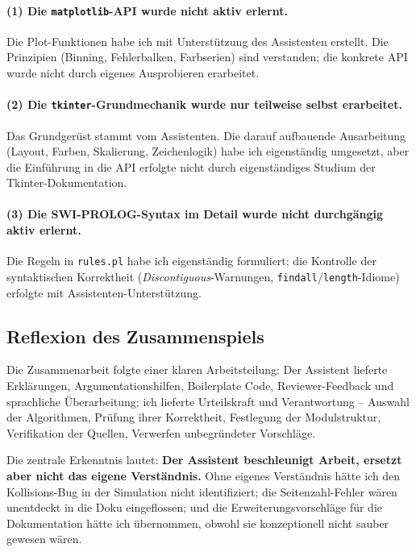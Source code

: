 \paragraph{(1) Die \texttt{matplotlib}-\acs{API} wurde nicht aktiv erlernt.}
Die Plot-Funktionen habe ich mit Unterstützung des Assistenten erstellt. Die Prinzipien (Binning, Fehlerbalken, Farbserien) sind verstanden; die konkrete \acs{API} wurde nicht durch eigenes Ausprobieren erarbeitet.

\paragraph{(2) Die \texttt{tkinter}-Grundmechanik wurde nur teilweise selbst erarbeitet.} Das Grundgerüst stammt vom Assistenten. Die darauf aufbauende Ausarbeitung (Layout, Farben, Skalierung, Zeichenlogik) habe ich eigenständig umgesetzt, aber die Einführung in die \acs{API} erfolgte nicht durch eigenständiges Studium der Tkinter-Dokumentation.

\paragraph{(3) Die \acs{SWI}-\acs{PROLOG}-Syntax im Detail wurde nicht durchgängig aktiv erlernt.} Die Regeln in \texttt{rules.pl} habe ich eigenständig formuliert; die Kontrolle der syntaktischen Korrektheit (\textit{Discontiguous}-Warnungen, \texttt{findall}/\texttt{length}-Idiome) erfolgte mit Assistenten-Unterstützung.

\subsection{Reflexion des Zusammenspiels}

Die Zusammenarbeit folgte einer klaren Arbeitsteilung: Der Assistent lieferte Erklärungen, Argumentationshilfen, Boilerplate Code, Reviewer-Feedback und sprachliche Überarbeitung; ich lieferte Urteilskraft und Verantwortung -- Auswahl der Algorithmen, Prüfung ihrer Korrektheit, Festlegung der Modulstruktur, Verifikation der Quellen, Verwerfen unbegründeter Vorschläge.

Die zentrale Erkenntnis lautet: \textbf{Der Assistent beschleunigt Arbeit, ersetzt aber nicht das eigene Verständnis.} Ohne eigenes Verständnis hätte ich den Kollisions-Bug in der Simulation nicht identifiziert; die Seitenzahl-Fehler wären unentdeckt in die Doku eingeflossen; und die Erweiterungsvorschläge für die Dokumentation hätte ich übernommen, obwohl sie konzeptionell nicht sauber gewesen wären.

